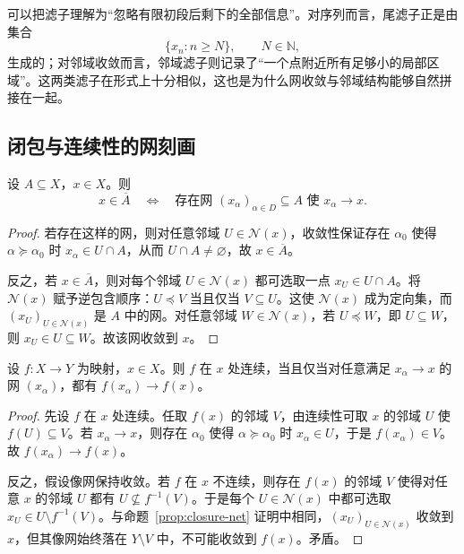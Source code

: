 可以把滤子理解为“忽略有限初段后剩下的全部信息”。对序列而言，尾滤子正是由集合
\[
\{x_n:n\ge N\},\qquad N\in\mathbb N,
\]
生成的；对邻域收敛而言，邻域滤子则记录了“一个点附近所有足够小的局部区域”。这两类滤子在形式上十分相似，这也是为什么网收敛与邻域结构能够自然拼接在一起。

\subsection{闭包与连续性的网刻画}

\begin{proposition}[闭包的网刻画]\label{prop:closure-net}
设 $A\subseteq X$，$x\in X$。则
\[
x\in\overline{A}
\quad\Longleftrightarrow\quad
\text{存在网 }(x_\alpha)_{\alpha\in D}\subseteq A\text{ 使 }x_\alpha\to x.
\]
\end{proposition}

\begin{proof}
若存在这样的网，则对任意邻域 $U\in\mathcal N(x)$，收敛性保证存在 $\alpha_0$ 使得 $\alpha\succeq\alpha_0$ 时 $x_\alpha\in U\cap A$，从而 $U\cap A\neq\varnothing$，故 $x\in\overline{A}$。

反之，若 $x\in\overline{A}$，则对每个邻域 $U\in\mathcal N(x)$ 都可选取一点 $x_U\in U\cap A$。将 $\mathcal N(x)$ 赋予逆包含顺序：$U\preceq V$ 当且仅当 $V\subseteq U$。这使 $\mathcal N(x)$ 成为定向集，而 $(x_U)_{U\in\mathcal N(x)}$ 是 $A$ 中的网。对任意邻域 $W\in\mathcal N(x)$，若 $U\preceq W$，即 $U\subseteq W$，则 $x_U\in U\subseteq W$。故该网收敛到 $x$。
\end{proof}

\begin{proposition}[连续性的网刻画]\label{prop:continuity-net}
设 $f\colon X\to Y$ 为映射，$x\in X$。则 $f$ 在 $x$ 处连续，当且仅当对任意满足 $x_\alpha\to x$ 的网 $(x_\alpha)$，都有 $f(x_\alpha)\to f(x)$。
\end{proposition}

\begin{proof}
先设 $f$ 在 $x$ 处连续。任取 $f(x)$ 的邻域 $V$，由连续性可取 $x$ 的邻域 $U$ 使 $f(U)\subseteq V$。若 $x_\alpha\to x$，则存在 $\alpha_0$ 使得 $\alpha\succeq\alpha_0$ 时 $x_\alpha\in U$，于是 $f(x_\alpha)\in V$。故 $f(x_\alpha)\to f(x)$。

反之，假设像网保持收敛。若 $f$ 在 $x$ 不连续，则存在 $f(x)$ 的邻域 $V$ 使得对任意 $x$ 的邻域 $U$ 都有 $U\not\subseteq f^{-1}(V)$。于是每个 $U\in\mathcal N(x)$ 中都可选取 $x_U\in U\setminus f^{-1}(V)$。与命题~\ref{prop:closure-net} 证明中相同，$(x_U)_{U\in\mathcal N(x)}$ 收敛到 $x$，但其像网始终落在 $Y\setminus V$ 中，不可能收敛到 $f(x)$。矛盾。
\end{proof}

